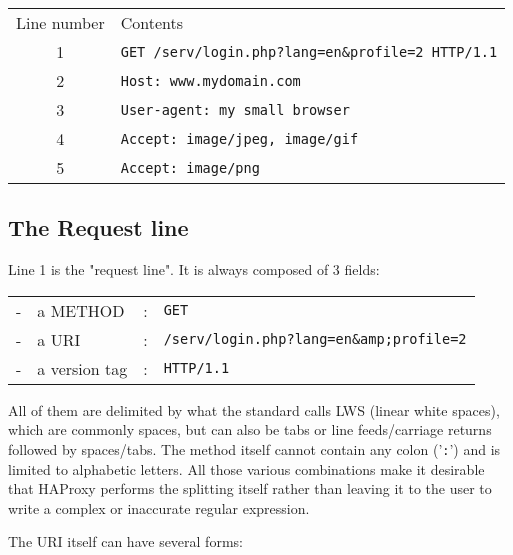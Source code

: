 \vspace{2mm}
\begin{tabular}{cl}
Line number & Contents \\
1 & \verb|GET /serv/login.php?lang=en&profile=2 HTTP/1.1| \\
2 & \verb|Host: www.mydomain.com| \\
3 & \verb|User-agent: my small browser| \\
4 & \verb|Accept: image/jpeg, image/gif| \\
5 & \verb|Accept: image/png| \\
\end{tabular}
\vspace{2mm}

\subsection{The Request line}
Line 1 is the "request line". It is always composed of 3 fields:

\vspace{2mm}
\begin{tabular}{clcl}
- & a METHOD      & : & \verb|GET| \\
- & a URI         & : & \verb|/serv/login.php?lang=en&amp;profile=2| \\
- & a version tag & : & \verb|HTTP/1.1| \\
\end{tabular}
\vspace{2mm}

All of them are delimited by what the standard calls LWS (linear white spaces),
which are commonly spaces, but can also be tabs or line feeds/carriage returns
followed by spaces/tabs. The method itself cannot contain any colon ('\verb|:|') and
is limited to alphabetic letters. All those various combinations make it
desirable that HAProxy performs the splitting itself rather than leaving it to
the user to write a complex or inaccurate regular expression.

The URI itself can have several forms:

